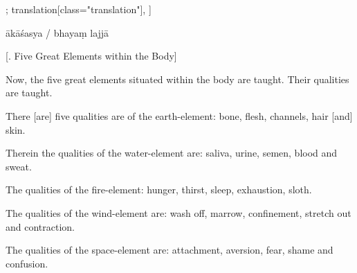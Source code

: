 \begin{alignment}[
  texts=edition[class="edition"];
  translation[class="translation"],
  ]
\begin{edition}
\begin{prose}
ākāśasya /
\dd{}
\dd{}
bhayaṃ\dd{}
lajjā\dd{}
\dd{}
\end{prose}
  \end{edition}
  \begin{translation}
    \begin{tlate}
    \centerline{\textrm{\small{[. Five Great Elements within the Body]}}}
    \label{fivegreatelementstrans}
    \bigskip
    \noindent
    Now, the five great elements situated within the body are taught. Their qualities are taught.

There [are] five qualities are of the earth-element: bone, flesh, channels, hair [and] skin.

Therein the qualities of the water-element are: saliva, urine, semen, blood and sweat.

The qualities of the fire-element: hunger, thirst, sleep, exhaustion, sloth.

The qualities of the wind-element are: wash off, marrow, confinement, stretch out and contraction.

The qualities of the space-element are: attachment, aversion, fear, shame and confusion.
    \end{tlate}
  \end{translation}
\end{alignment}
\pagebreak %
